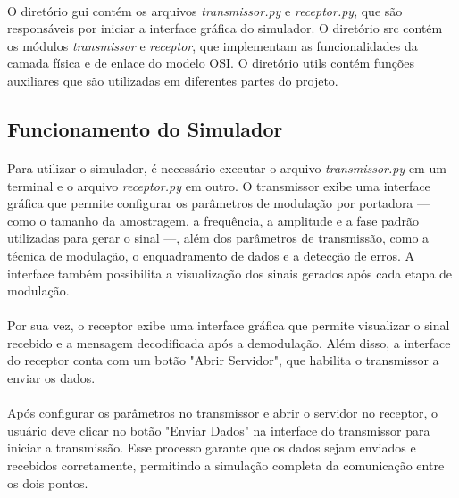 \documentclass[12pt, a4paper]{article}
\begin{document}
\paragraph{}
O diretório \textcolor{roxo}{gui} contém os arquivos \textit{transmissor.py} e \textit{receptor.py}, que são responsáveis por iniciar a interface gráfica do simulador. O diretório \textcolor{verde}{src} contém os módulos \textit{transmissor} e \textit{receptor}, que implementam as funcionalidades da camada física e de enlace do modelo OSI. O diretório \textcolor{verde_claro}{utils} contém funções auxiliares que são utilizadas em diferentes partes do projeto.

\subsection{Funcionamento do Simulador}
\paragraph{}
Para utilizar o simulador, é necessário executar o arquivo \textit{transmissor.py} em um terminal e o arquivo \textit{receptor.py} em outro. O transmissor exibe uma interface gráfica que permite configurar os parâmetros de modulação por portadora — como o tamanho da amostragem, a frequência, a amplitude e a fase padrão utilizadas para gerar o sinal —, além dos parâmetros de transmissão, como a técnica de modulação, o enquadramento de dados e a detecção de erros. A interface também possibilita a visualização dos sinais gerados após cada etapa de modulação.

\paragraph{}
Por sua vez, o receptor exibe uma interface gráfica que permite visualizar o sinal recebido e a mensagem decodificada após a demodulação. Além disso, a interface do receptor conta com um botão "Abrir Servidor", que habilita o transmissor a enviar os dados.

\paragraph{}
Após configurar os parâmetros no transmissor e abrir o servidor no receptor, o usuário deve clicar no botão "Enviar Dados" na interface do transmissor para iniciar a transmissão. Esse processo garante que os dados sejam enviados e recebidos corretamente, permitindo a simulação completa da comunicação entre os dois pontos.
\end{document}
